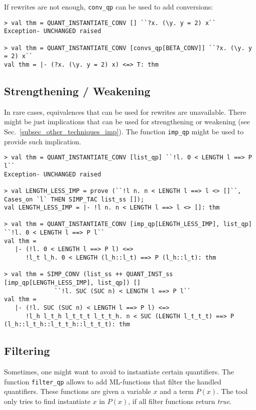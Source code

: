 \documentclass[a4paper,12pt,DIV=12,oneside]{scrbook}
\theoremstyle{definition}
\theoremstyle{remark}
\begin{document}
If rewrites are not enough, \texttt{conv\_qp} can be used to add conversions:

{\scriptsize
\begin{verbatim}
> val thm = QUANT_INSTANTIATE_CONV [] ``?x. (\y. y = 2) x``
Exception- UNCHANGED raised

> val thm = QUANT_INSTANTIATE_CONV [convs_qp[BETA_CONV]] ``?x. (\y. y = 2) x``
val thm = |- (?x. (\y. y = 2) x) <=> T: thm
\end{verbatim}}

\subsection{Strengthening / Weakening}

In rare cases, equivalences that can be used for rewrites are unavailable. There might be just implications that
can be used for strengthening or weakening (see Sec.~\ref{subsec_other_techniques_imp}). The function
\texttt{imp\_qp} might be used to provide such implication.

{\scriptsize
\begin{verbatim}
> val thm = QUANT_INSTANTIATE_CONV [list_qp] ``!l. 0 < LENGTH l ==> P l``
Exception- UNCHANGED raised

> val LENGTH_LESS_IMP = prove (``!l n. n < LENGTH l ==> l <> []``, Cases_on `l` THEN SIMP_TAC list_ss []);
val LENGTH_LESS_IMP = |- !l n. n < LENGTH l ==> l <> []: thm

> val thm = QUANT_INSTANTIATE_CONV [imp_qp[LENGTH_LESS_IMP], list_qp] ``!l. 0 < LENGTH l ==> P l``
val thm =
   |- (!l. 0 < LENGTH l ==> P l) <=>
      !l_t l_h. 0 < LENGTH (l_h::l_t) ==> P (l_h::l_t): thm

> val thm = SIMP_CONV (list_ss ++ QUANT_INST_ss [imp_qp[LENGTH_LESS_IMP], list_qp]) []
              ``!l. SUC (SUC n) < LENGTH l ==> P l``
val thm =
   |- (!l. SUC (SUC n) < LENGTH l ==> P l) <=>
      !l_h l_t_h l_t_t_t l_t_t_h. n < SUC (LENGTH l_t_t_t) ==> P (l_h::l_t_h::l_t_t_h::l_t_t_t): thm
\end{verbatim}}


\subsection{Filtering}
Sometimes, one might want to avoid to instantiate certain quantifiers.
The function \texttt{filter\_qp} allows to add ML-functions that filter the handled
quantifiers. These functions are given a variable $x$ and a term $P(x)$.
The tool only tries to find instantiate $x$ in $P(x)$, if all filter functions
return \textit{true}.
\end{document}
